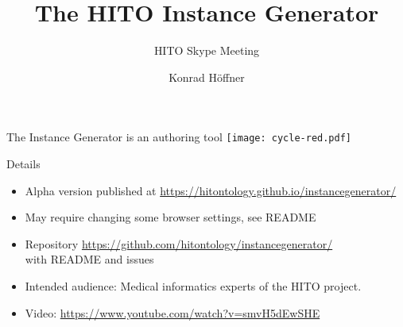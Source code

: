\documentclass[aspectratio=1610]{beamer}
\title{The HITO Instance Generator}
\subtitle{HITO Skype Meeting}
\author{Konrad Höffner}
\begin{document}
\begin{frame}
\titlepage
\end{frame}

\begin{frame}{The Instance Generator is an authoring tool}
\centering
\texttt{[image: cycle-red.pdf]}
\end{frame}

\begin{frame}{Details}
\begin{itemize}
\item Alpha version published at \url{https://hitontology.github.io/instancegenerator/}
\item May require changing some browser settings, see README
\item Repository \url{https://github.com/hitontology/instancegenerator/}\\with README and issues
\item Intended audience: Medical informatics experts of the HITO project.
\item Video: \url{https://www.youtube.com/watch?v=smvH5dEwSHE}
\end{itemize}
\end{frame}
\end{document}
